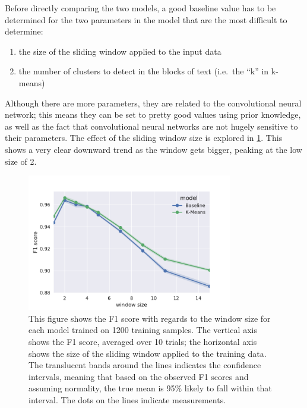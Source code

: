 Before directly comparing the two models, a good baseline value has to be
determined for the two parameters in the model that are the most difficult to
determine:
\begin{enumerate}
  \item the size of the sliding window applied to the input data
  \item the number of clusters to detect in the blocks of text (i.e.\ the ``k''
    in k-means)
\end{enumerate}
Although there are more parameters, they are related to the convolutional
neural network; this means they can be set to pretty good values using prior
knowledge, as well as the fact that convolutional neural networks are not hugely
sensitive to their parameters. The effect of the sliding window size is explored
in \cref{fig:window}. This shows a very clear downward trend as the window gets
bigger, peaking at the low size of 2.
\begin{figure}[tb]
  \centering
  \includegraphics[width=0.8\textwidth]{figures/results/800-windowsize/tseries_f1.pdf}
  \caption{This figure shows the F1 score with regards to the window size for
    each model trained on 1200 training samples.  The vertical axis shows the F1
    score, averaged over 10 trials; the horizontal axis shows the size of the
    sliding window applied to the training data. The translucent bands around the
    lines indicates the confidence intervals, meaning that based on the observed F1
    scores and assuming normality, the true mean is 95\% likely to
    fall within that interval. The dots on the lines indicate measurements.\label{fig:window}}
\end{figure}

